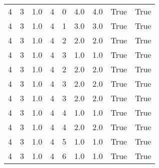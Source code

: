 \documentclass[a4paper,12pt]{article}
\begin{document}
\begin{center}
\begin{tabular}{ c c c | c c c | c | c | c}
        4 & 3 & 1.0 & 4 & 0 & 4.0 & 4.0 & True & True     \\
        4 & 3 & 1.0 & 4 & 1 & 3.0 & 3.0 & True & True     \\
        4 & 3 & 1.0 & 4 & 2 & 2.0 & 2.0 & True & True     \\
        4 & 3 & 1.0 & 4 & 3 & 1.0 & 1.0 & True & True     \\
        4 & 3 & 1.0 & 4 & 2 & 2.0 & 2.0 & True & True     \\
        4 & 3 & 1.0 & 4 & 3 & 2.0 & 2.0 & True & True     \\
        4 & 3 & 1.0 & 4 & 3 & 2.0 & 2.0 & True & True     \\
        4 & 3 & 1.0 & 4 & 4 & 1.0 & 1.0 & True & True     \\
        4 & 3 & 1.0 & 4 & 4 & 2.0 & 2.0 & True & True     \\
        4 & 3 & 1.0 & 4 & 5 & 1.0 & 1.0 & True & True     \\
        4 & 3 & 1.0 & 4 & 6 & 1.0 & 1.0 & True & True     \\
    \end{tabular}
\end{center}
\end{document}
